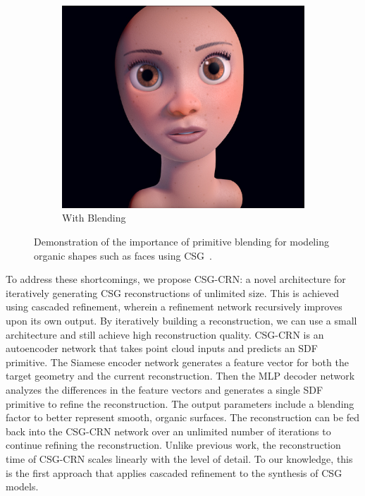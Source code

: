 \begin{figure}[!b]
\begin{subfigure}[t]{0.45\textwidth}
		\includegraphics[width=\textwidth]{Images/Face with blending}
		\caption{With Blending}
	\end{subfigure}
	\caption{Demonstration of the importance of primitive blending for modeling organic shapes such as faces using CSG~\cite{Quilez2013}.}
	\label{fig:primitive_blending}
\end{figure}

To address these shortcomings, we propose CSG-CRN: a novel architecture for iteratively generating CSG reconstructions of unlimited size. This is achieved using cascaded refinement, wherein a refinement network recursively improves upon its own output. By iteratively building a reconstruction, we can use a small architecture and still achieve high reconstruction quality. CSG-CRN is an autoencoder network that takes point cloud inputs and predicts an SDF primitive. The Siamese encoder network generates a feature vector for both the target geometry and the current reconstruction. Then the MLP decoder network analyzes the differences in the feature vectors and generates a single SDF primitive to refine the reconstruction. The output parameters include a blending factor to better represent smooth, organic surfaces. The reconstruction can be fed back into the CSG-CRN network over an unlimited number of iterations to continue refining the reconstruction. Unlike previous work, the reconstruction time of CSG-CRN scales linearly with the level of detail. To our knowledge, this is the first approach that applies cascaded refinement to the synthesis of CSG models.

